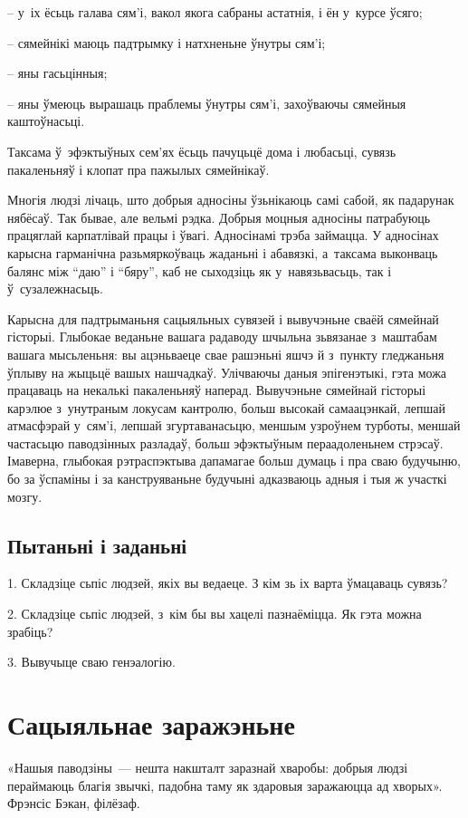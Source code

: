 – у~іх ёсьць галава сям'і, вакол якога сабраны астатнія, і ён у~курсе ўсяго;

– сямейнікі маюць падтрымку і натхненьне ўнутры сям'і;

– яны гасьцінныя;

– яны ўмеюць вырашаць праблемы ўнутры сям'і, захоўваючы сямейныя каштоўнасьці.

Таксама ў~эфэктыўных сем'ях ёсьць пачуцьцё дома і любасьці, сувязь пакаленьняў і клопат пра пажылых сямейнікаў.

Многія людзі лічаць, што добрыя адносіны ўзьнікаюць самі сабой, як падарунак нябёсаў. Так бывае, але вельмі рэдка. Добрыя моцныя адносіны патрабуюць працяглай карпатлівай працы і ўвагі. Адносінамі трэба займацца. У адносінах карысна гарманічна разьмяркоўваць жаданьні і абавязкі, а~таксама выконваць балянс між ``даю'' і ``бяру'', каб не сыходзіць як у~навязьвасьць, так і ў~сузалежнасьць.

Карысна для падтрыманьня сацыяльных сувязей і вывучэньне сваёй сямейнай гісторыі. Глыбокае веданьне вашага радаводу шчыльна зьвязанае з~маштабам вашага мысьленьня: вы ацэньваеце свае рашэньні яшчэ й з~пункту гледжаньня ўплыву на жыцьцё вашых нашчадкаў. Улічваючы даныя эпігенэтыкі, гэта можа працаваць на некалькі пакаленьняў наперад. Вывучэньне сямейнай гісторыі карэлюе з~унутраным локусам кантролю, больш высокай самаацэнкай, лепшай атмасфэрай у~сям'і, лепшай згуртаванасьцю, меншым узроўнем турботы, меншай частасьцю паводзінных разладаў, больш эфэктыўным пераадоленьнем стрэсаў. Імаверна, глыбокая рэтраспэктыва дапамагае больш думаць і пра сваю будучыню, бо за ўспаміны і за канструяваньне будучыні адказваюць адныя і тыя ж участкі мозгу.

\subsection*{Пытаньні і заданьні}

1. Складзіце сьпіс людзей, якіх вы ведаеце. З кім зь іх варта ўмацаваць сувязь?

2. Складзіце сьпіс людзей, з~кім бы вы хацелі пазнаёміцца. Як гэта можна зрабіць?

3. Вывучыце сваю генэалогію.


\section{Сацыяльнае заражэньне}

«Нашыя паводзіны~--- нешта накшталт заразнай хваробы: добрыя людзі пераймаюць благія звычкі, падобна таму як здаровыя заражаюцца ад хворых». Фрэнсіс Бэкан, філёзаф. 

